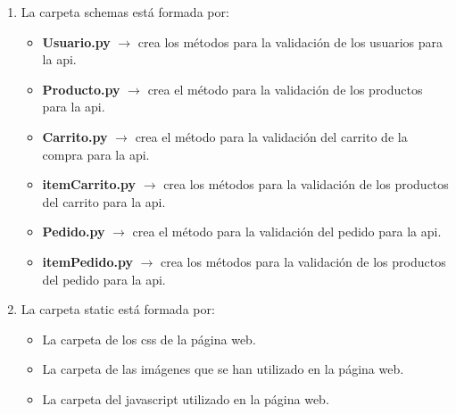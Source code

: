 \documentclass[10pt]{book}
\begin{document}
\begin{enumerate}
\begin{itemize}
            \end{itemize}
        \item La carpeta schemas está formada por:
            \begin{itemize}
                \item \textbf{Usuario.py} $\rightarrow$ crea los métodos para la validación de los usuarios para la api.
                \item \textbf{Producto.py} $\rightarrow$ crea el método para la validación de los productos para la api.
                \item \textbf{Carrito.py} $\rightarrow$ crea el método para la validación del carrito de la compra para la api.
                \item \textbf{itemCarrito.py} $\rightarrow$ crea los métodos para la validación de los productos del carrito para la api.
                \item \textbf{Pedido.py} $\rightarrow$ crea el método para la validación del pedido para la api.
                \item \textbf{itemPedido.py} $\rightarrow$ crea los métodos para la validación de los productos del pedido para la api.
            \end{itemize}
        \item  La carpeta static está formada por:
            \begin{itemize}
                \item La carpeta de los css de la página web.
                \item La carpeta de las imágenes que se han utilizado en la página web.
                \item La carpeta del javascript utilizado en la página web.
            \end{itemize}
            

\end{enumerate}
\end{document}
